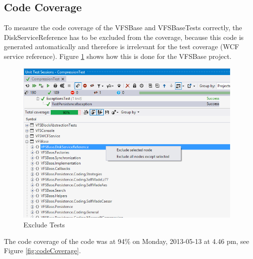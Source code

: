 \documentclass[JCDReport.tex]{subfiles}
\begin{document}
\subsection{Code Coverage}

To measure the code coverage of the VFSBase and VFSBaseTests correctly, the DiskServiceReference has to be excluded from the coverage, because this code is generated automatically and therefore is irrelevant for the test coverage (WCF service reference). Figure \ref{fig:excludeTests} shows how this is done for the VFSBase project.\\

\begin{figure}[h!]
	\centering
	\includegraphics[scale=0.75]{Images/code_coverage1.png} 
	\caption{Exclude Tests}
	\label{fig:excludeTests}
\end{figure}	

The code coverage of the code was at 94\% on Monday, 2013-05-13 at 4.46 pm, see Figure \ref{fig:codeCoverage}.
\end{document}
